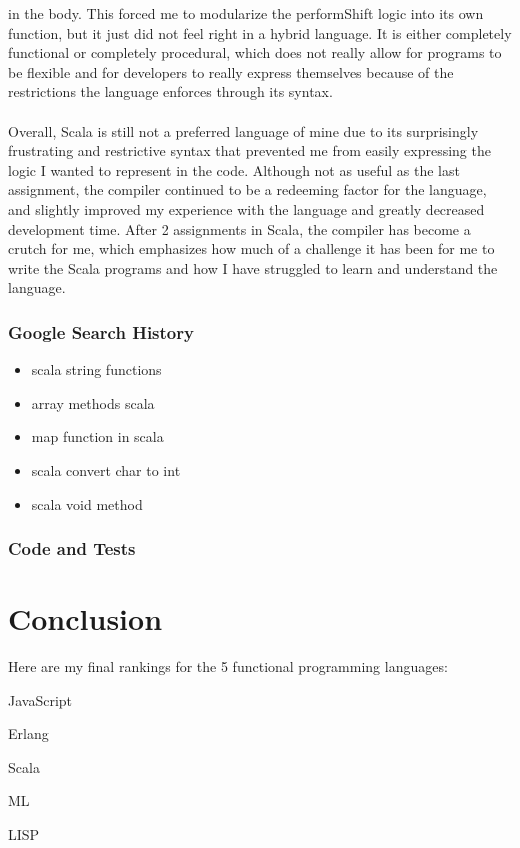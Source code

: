 \documentclass[letterpaper, 10pt, DIV=13]{scrartcl}
\numberwithin{equation}{section}
\numberwithin{figure}{section}
\numberwithin{table}{section}
\begin{document}
in the body. This forced me to modularize the performShift logic into its own function, but it just did not feel right in a hybrid language. It is either completely
functional or completely procedural, which does not really allow for programs to be flexible and for developers to really express themselves because of the
restrictions the language enforces through its syntax.
\\ \\
Overall, Scala is still not a preferred language of mine due to its surprisingly frustrating and restrictive syntax that prevented me from easily expressing
the logic I wanted to represent in the code. Although not as useful as the last assignment, the compiler continued to be a redeeming factor for the language, and
slightly improved my experience with the language and greatly decreased development time. After 2 assignments in Scala, the compiler has become a crutch for me,
which emphasizes how much of a challenge it has been for me to write the Scala programs and how I have struggled to learn and understand the language.

\subsubsection{Google Search History}
\begin{itemize}
    \item scala string functions
    \item array methods scala
    \item map function in scala
    \item scala convert char to int
    \item scala void method
\end{itemize}

\subsubsection{Code and Tests}



\section{Conclusion}
Here are my final rankings for the 5 functional programming languages:
\begin{etaremune}
    \item JavaScript
    \item Erlang
    \item Scala
    \item ML
    \item LISP
\end{etaremune}
\end{document}
